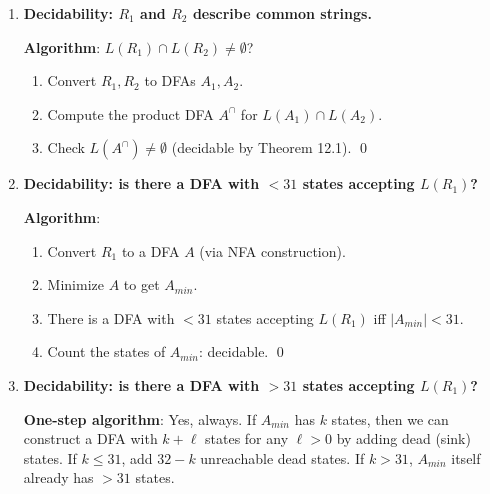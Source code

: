 \begin{enumerate}[{12.}1. ]
\textbf{Algorithm}:
\begin{enumerate}
\item Convert regular expressions $R_1$ and $R_2$ to DFAs $A_1$ and $A_2$.
\item Check $L(A_1) = \overline{L(A_2)}$: equivalently, check $L(A_1)\subseteq\overline{L(A_2)}$ and $\overline{L(A_2)}\subseteq L(A_1)$.
\item By Exercise 12.4, each subset relation is decidable. Equivalently, check $L(A_1) \cup L(A_2) = \Sigma^*$ and $L(A_1)\cap L(A_2)=\emptyset$.
\item Both conditions are decidable (using complement, intersection, and emptiness). \qed
\end{enumerate}

\item \textbf{Decidability: $R_1$ and $R_2$ describe common strings.}

\textbf{Algorithm}: $L(R_1)\cap L(R_2)\neq\emptyset$?
\begin{enumerate}
\item Convert $R_1,R_2$ to DFAs $A_1,A_2$.
\item Compute the product DFA $A^\cap$ for $L(A_1)\cap L(A_2)$.
\item Check $L(A^\cap)\neq\emptyset$ (decidable by Theorem 12.1). \qed
\end{enumerate}

\item \textbf{Decidability: is there a DFA with $< 31$ states accepting $L(R_1)$?}

\textbf{Algorithm}:
\begin{enumerate}
\item Convert $R_1$ to a DFA $A$ (via NFA construction).
\item Minimize $A$ to get $A_{min}$.
\item There is a DFA with $<31$ states accepting $L(R_1)$ iff $|A_{min}| < 31$.
\item Count the states of $A_{min}$: decidable. \qed
\end{enumerate}

\item \textbf{Decidability: is there a DFA with $>31$ states accepting $L(R_1)$?}

\textbf{One-step algorithm}: Yes, always. If $A_{min}$ has $k$ states, then we can construct a DFA with $k + \ell$ states for any $\ell > 0$ by adding dead (sink) states. If $k \leq 31$, add $32-k$ unreachable dead states. If $k > 31$, $A_{min}$ itself already has $>31$ states.


\end{enumerate}
